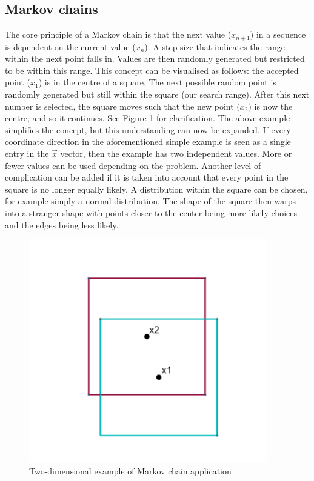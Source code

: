 	\subsection{Markov chains}	\label{markovexpl}
	The core principle of a Markov chain is that the next value  ($x_{n+1}$) in a sequence is dependent on the current value  ($x_n$). 
	A step size that indicates the range within the next point falls in.
	Values are then randomly generated but restricted to be within this range.
	This concept can be visualised as follows: the accepted point  ($x_1$) is in the centre of a square. The next possible random point is randomly generated but still within the square (our search range). 	
	After this next number is selected, the square moves such that the new point  ($x_2$) is now the centre, and so it continues.
	See Figure \ref{fig:MCsquare} for clarification.
	The above example simplifies the concept, but this understanding can now be expanded.
	If every coordinate direction in the aforementioned simple example is seen as a single entry in the $\vec{x}$ vector, then the example has two independent values.
	More or fewer values can be used depending on the problem.
	Another level of complication can be added if it is taken into account that every point in the square is no longer equally likely.
	A distribution within the square can be chosen, for example simply a normal distribution.
	The shape of the square then warps into a stranger shape with points closer to the center being more likely choices and the edges being less likely.
	

	\begin{figure}	
	\centering
	\includegraphics[width=0.55\linewidth]{figures/MC_squares1.png}
	\caption{Two-dimensional example of Markov chain application}
	\label{fig:MCsquare}
	\end{figure}
	
